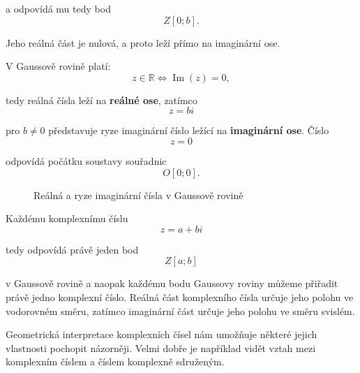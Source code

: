\documentclass[12pt,a4paper]{article}
\begin{document}
a odpovídá mu tedy bod
\[
    Z[0;b].
\]

Jeho reálná část je nulová, a proto leží přímo na imaginární ose.

\begin{notebox}
    V Gaussově rovině platí:
    \[
        z\in\mathbb{R}
        \iff
        \operatorname{Im}(z)=0,
    \]

    tedy reálná čísla leží na \textbf{reálné ose}, zatímco
    \[
        z=bi
    \]

    pro $b\neq0$ představuje ryze imaginární číslo ležící na \textbf{imaginární ose}.
    Číslo
    \[
        z=0
    \]

    odpovídá počátku soustavy souřadnic
    \[
        O[0;0].
    \]
\end{notebox}



\begin{figure}[ht]
    \begin{center}
    \end{center}
    \caption{Reálná a ryze imaginární čísla v Gaussově rovině}
\end{figure}

Každému komplexnímu číslu
\[
    z=a+bi
\]

tedy odpovídá právě jeden bod
\[
    Z[a;b]
\]

v Gaussově rovině a naopak každému bodu Gaussovy roviny můžeme přiřadit právě jedno komplexní číslo. 
Reálná část komplexního čísla určuje jeho polohu ve vodorovném směru,
zatímco imaginární část určuje jeho polohu ve směru svislém.

Geometrická interpretace komplexních čísel nám umožňuje některé jejich vlastnosti pochopit názorněji. 
Velmi dobře je například vidět vztah mezi komplexním číslem
a číslem komplexně sdruženým.
\end{document}
